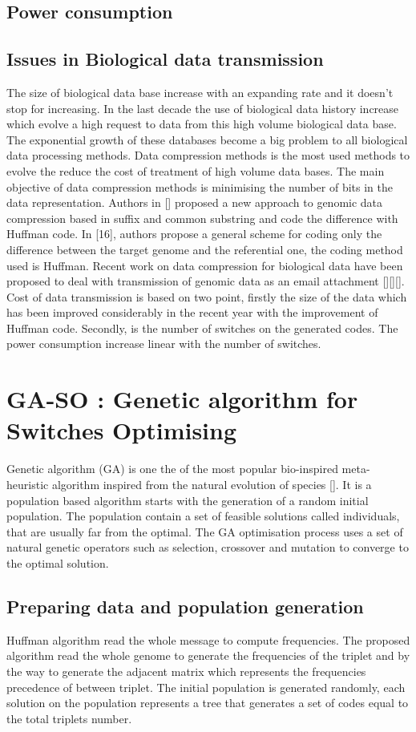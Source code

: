 \documentclass[preprint,12pt]{elsarticle}
\begin{document}
\subsection{Power consumption}
\subsection{Issues in Biological data transmission}
The size of biological data base increase with an expanding rate and it doesn't stop for increasing. In the last decade the use of biological data history increase which evolve a high request to data from this high volume biological data base. The exponential growth of these databases become a big problem to all biological data processing methods. Data compression methods is the most used methods to evolve the reduce the cost of treatment of high volume data bases.  The main objective of data compression methods is minimising the number of bits in the data representation. Authors in [] proposed a new approach to genomic data compression based in suffix and common substring and code the difference with Huffman code. In [16], authors propose a general scheme for coding only the difference between the target genome and the referential one, the coding method used is Huffman. Recent work on data compression for biological data have been proposed to deal with transmission of genomic data as an email attachment [][][]. Cost of data transmission is based on two point, firstly the size of the data which has been improved considerably in the recent year with the improvement of Huffman code. Secondly, is the number of switches on the generated codes. The power consumption increase linear with the number of switches.
\section{GA-SO : Genetic algorithm for Switches Optimising}
Genetic algorithm (GA) is one the of the most popular bio-inspired meta-heuristic algorithm inspired from the natural evolution of species []. It is a  population based algorithm starts with the generation of a random initial population. The population contain a set of feasible solutions called individuals, that are usually far from the optimal. The GA optimisation process uses a set of natural genetic operators such as selection, crossover and mutation to converge to the optimal solution.
\subsection{Preparing data and population generation}
Huffman algorithm read the whole message to compute frequencies. The proposed algorithm read the whole genome to generate the frequencies of the triplet and by the way to generate the adjacent matrix which represents the frequencies precedence of between triplet. The initial population is generated randomly, each solution on the population represents a tree that generates a set of codes equal to the total triplets number.
\end{document}
